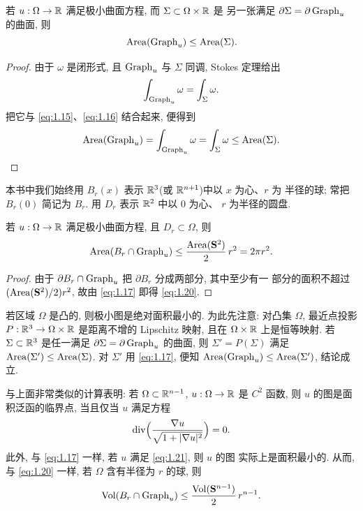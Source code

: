 \begin{lemma}
\label{lem:1.1}
若 $u:\Omega\to\mathbb{R}$ 满足极小曲面方程, 而 $\Sigma\subset\Omega\times\mathbb{R}$ 是
另一张满足 $\partial\Sigma=\partial\operatorname{Graph}_u$ 的曲面, 则
\begin{equation}
\operatorname{Area}(\operatorname{Graph}_u)\leq\operatorname{Area}(\Sigma).
\label{eq:1.17}
\end{equation}
\end{lemma}

\begin{proof}
由于 $\omega$ 是闭形式, 且 $\operatorname{Graph}_u$ 与 $\Sigma$ 同调, Stokes 定理给出
\begin{equation}
\int_{\operatorname{Graph}_u}\omega=\int_{\Sigma}\omega.
\label{eq:1.18}
\end{equation}
把它与 \eqref{eq:1.15}、\eqref{eq:1.16} 结合起来, 便得到
\begin{equation}
\operatorname{Area}(\operatorname{Graph}_u)=\int_{\operatorname{Graph}_u}\omega=\int_{\Sigma}\omega\leq\operatorname{Area}(\Sigma).
\label{eq:1.19}
\end{equation}
\end{proof}

本书中我们始终用 $B_r(x)$ 表示 $\mathbb{R}^3$(或 $\mathbb{R}^{n+1}$)中以 $x$ 为心、$r$ 为
半径的球; 常把 $B_r(0)$ 简记为 $B_r$. 用 $D_r$ 表示 $\mathbb{R}^2$ 中以 $0$ 为心、
$r$ 为半径的圆盘.

\begin{corollary}
\label{cor:1.2}
若 $u:\Omega\to\mathbb{R}$ 满足极小曲面方程, 且 $D_r\subset\Omega$, 则
\begin{equation}
\operatorname{Area}(B_r\cap\operatorname{Graph}_u)\leq
  \frac{\operatorname{Area}(\mathbf{S}^2)}{2}\,r^2=2\pi r^2.
\label{eq:1.20}
\end{equation}
\end{corollary}

\begin{proof}
由于 $\partial B_r\cap\operatorname{Graph}_u$ 把 $\partial B_r$ 分成两部分, 其中至少有一
部分的面积不超过 $(\operatorname{Area}(\mathbf{S}^2)/2)r^2$, 故由 \eqref{eq:1.17} 即得
\eqref{eq:1.20}.
\end{proof}

若区域 $\Omega$ 是凸的, 则极小图是绝对面积最小的. 为此先注意: 对凸集
$\Omega$, 最近点投影 $P:\mathbb{R}^3\to\Omega\times\mathbb{R}$ 是距离不增的 Lipschitz 映射,
且在 $\Omega\times\mathbb{R}$ 上是恒等映射. 若 $\Sigma\subset\mathbb{R}^3$ 是任一满足
$\partial\Sigma=\partial\operatorname{Graph}_u$ 的曲面, 则 $\Sigma'=P(\Sigma)$ 满足
$\operatorname{Area}(\Sigma')\leq\operatorname{Area}(\Sigma)$. 对 $\Sigma'$ 用 \eqref{eq:1.17}, 便知
$\operatorname{Area}(\operatorname{Graph}_u)\leq\operatorname{Area}(\Sigma')$, 结论成立.

与上面非常类似的计算表明: 若 $\Omega\subset\mathbb{R}^{n-1}$, $u:\Omega\to\mathbb{R}$ 是
$C^2$ 函数, 则 $u$ 的图是面积泛函的临界点, 当且仅当 $u$ 满足方程
\begin{equation}
\operatorname{div}\Bigl(\frac{\nabla u}{\sqrt{1+|\nabla u|^2}}\Bigr)=0.
\label{eq:1.21}
\end{equation}
此外, 与 \eqref{eq:1.17} 一样, 若 $u$ 满足 \eqref{eq:1.21}, 则 $u$ 的图
实际上是面积最小的. 从而, 与 \eqref{eq:1.20} 一样, 若 $\Omega$ 含有半径为
$r$ 的球, 则
\begin{equation}
\operatorname{Vol}(B_r\cap\operatorname{Graph}_u)\leq
  \frac{\operatorname{Vol}(\mathbf{S}^{n-1})}{2}\,r^{n-1}.
\label{eq:1.22}
\end{equation}

